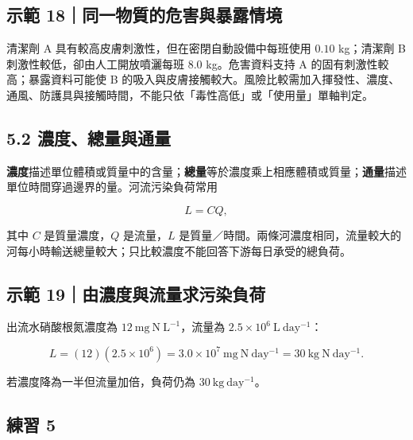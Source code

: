 \documentclass[11pt,a4paper]{article}
\begin{document}
\begin{HandoutWorkedExample}

\subsection{示範 18｜同一物質的危害與暴露情境}\label{ux793aux7bc4-18ux540cux4e00ux7269ux8ceaux7684ux5371ux5bb3ux8207ux66b4ux9732ux60c5ux5883}

清潔劑 A 具有較高皮膚刺激性，但在密閉自動設備中每班使用 \(0.10\) kg；清潔劑 B 刺激性較低，卻由人工開放噴灑每班 \(8.0\) kg。危害資料支持 A 的固有刺激性較高；暴露資料可能使 B 的吸入與皮膚接觸較大。風險比較需加入揮發性、濃度、通風、防護具與接觸時間，不能只依「毒性高低」或「使用量」單軸判定。

\end{HandoutWorkedExample}

\subsection{5.2 濃度、總量與通量}\label{ux6fc3ux5ea6ux7e3dux91cfux8207ux901aux91cf}

\textbf{濃度}描述單位體積或質量中的含量；\textbf{總量}等於濃度乘上相應體積或質量；\textbf{通量}描述單位時間穿過邊界的量。河流污染負荷常用

\[
L=CQ,
\]

其中 \(C\) 是質量濃度，\(Q\) 是流量，\(L\) 是質量／時間。兩條河濃度相同，流量較大的河每小時輸送總量較大；只比較濃度不能回答下游每日承受的總負荷。

\begin{HandoutWorkedExample}

\subsection{示範 19｜由濃度與流量求污染負荷}\label{ux793aux7bc4-19ux7531ux6fc3ux5ea6ux8207ux6d41ux91cfux6c42ux6c61ux67d3ux8ca0ux8377}

出流水硝酸根氮濃度為 \(12\ \mathrm{mg\ N\ L^{-1}}\)，流量為 \(2.5\times10^6\ \mathrm{L\ day^{-1}}\)：

\[
L=(12)(2.5\times10^6)=3.0\times10^7\ \mathrm{mg\ N\ day^{-1}}
=30\ \mathrm{kg\ N\ day^{-1}}.
\]

若濃度降為一半但流量加倍，負荷仍為 \(30\ \mathrm{kg\ day^{-1}}\)。

\end{HandoutWorkedExample}

\subsection{練習 5}\label{ux7df4ux7fd2-5}
\end{document}
